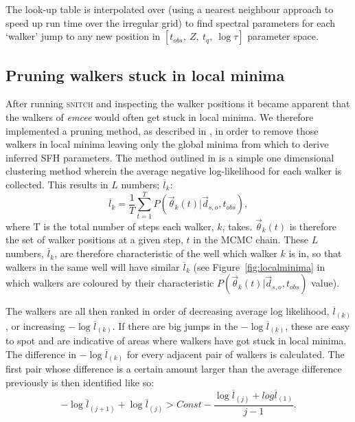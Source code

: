 \documentclass[useAMS,usenatbib]{mn2e}
\begin{document}
 
The look-up table is interpolated over (using a nearest neighbour approach to speed up run time over the irregular grid) to find spectral parameters for each `walker' jump to any new position in $[t_{obs},~Z,~t_q,~\log\tau]$ parameter space. 



\subsection{Pruning walkers stuck in local minima}\label{sec:pruning}


After running \textsc{snitch} and inspecting the walker positions it became apparent that the walkers of \emph{emcee} would often get stuck in local minima. We therefore implemented a pruning method, as described in \cite{hou12}, in order to remove those walkers in local minima leaving only the global minima from which to derive inferred SFH parameters. The method outlined in \cite{hou12} is a simple one dimensional clustering method wherein the average negative log-likelihood for each walker is collected. This results in $L$ numbers; $\overline{l}_k$:
\begin{equation}\label{eq:lnumbers}
\overline{l}_k = \frac{1}{T} \sum^{T}_{t=1} P(\vec{\theta}_k(t)|\vec{d}_{s,o}, t_{obs}),
\end{equation}
where T is the total number of steps each walker, $k$, takes. $\vec{\theta}_k(t)$ is therefore the set of walker positions at a given step, $t$ in the MCMC chain. These $L$ numbers, $\overline{l}_k$, are therefore characteristic of the well which walker $k$ is in, so that walkers in the same well will have similar $\overline{l}_k$ (see Figure~\ref{fig:localminima} in which walkers are coloured by their characteristic $P(\vec{\theta}_k(t)|\vec{d}_{s,o}, t_{obs})$ value). 


The walkers are all then ranked in order of decreasing average log likelihood, $\overline{l}_{(k)}$, or increasing $- \log \overline{l}_{(k)}$. If there are big jumps in the $- \log \overline{l}_{(k)}$, these are easy to spot and are indicative of areas where walkers have got stuck in local minima. The difference in $- \log \overline{l}_{(k)}$ for every adjacent pair of walkers is calculated. The first pair whose difference is a certain amount larger than the average difference previously is then identified like so:
\begin{equation}\label{eq:idprunes}
-\log \overline{l}_{(j+1)} + \log \overline{l}_{(j)} > Const − \frac{\log \overline{l}_{(j)} + log \overline{l}_{(1)}}{j - 1}.
\end{equation}
\end{document}

